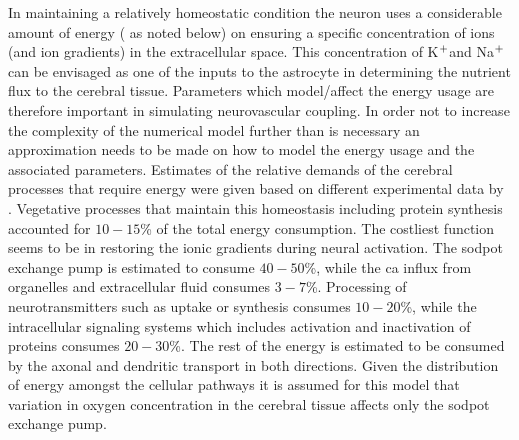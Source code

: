 \documentclass[smallextended]{svjour3}
\numberwithin{equation}{section}
\newcommand{\na}{Na$^{\text{\scriptsize +}}$}
\newcommand{\pot}{K$^{\text{\scriptsize +}}$}
\begin{document}
In maintaining a relatively homeostatic condition the neuron uses a considerable amount of energy ( as noted below) on ensuring a specific concentration of ions (and ion gradients) in the extracellular space. This concentration of \pot and \na can be envisaged as one of the inputs to the astrocyte in determining the nutrient flux to the cerebral tissue. Parameters which model/affect the energy usage are therefore important in simulating neurovascular coupling. In order not to increase the complexity of the numerical model further than is necessary an approximation needs to be made on how to model the energy usage and the associated parameters. Estimates of the relative demands of the cerebral processes that require energy were given based on different experimental data by \citet{Ames2000}. Vegetative processes that maintain this homeostasis including protein synthesis accounted for $10-15$\% of the total energy consumption. The costliest function seems to be in restoring the ionic gradients during neural activation. The \gls{sodpot} exchange pump is estimated to consume $40-50$\%, while the \gls{ca} influx from organelles and extracellular fluid consumes $3-7$\%. Processing of neurotransmitters such as uptake or synthesis consumes $10-20$\%, while the intracellular signaling systems which includes activation and inactivation of proteins consumes $20-30$\%. The rest of the energy is estimated to be consumed by the axonal and dendritic transport in both directions. Given the distribution of energy amongst the cellular pathways it is assumed for this model that variation in oxygen concentration in the cerebral tissue affects only the \gls{sodpot} exchange pump. 
\end{document}
